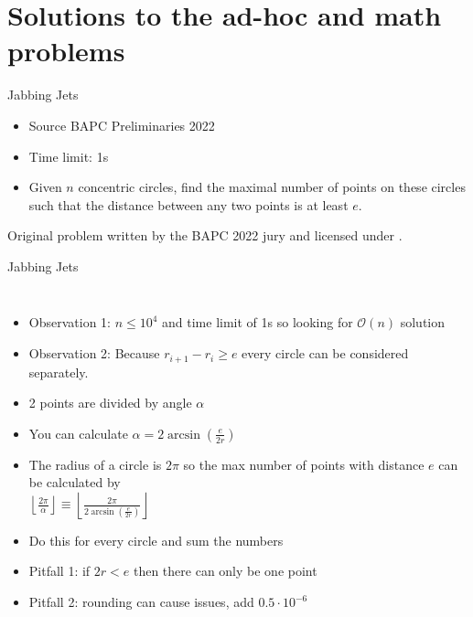 \documentclass[11pt,pdf, aspectratio=169]{beamer}
\begin{document}
  \section{Solutions to the ad-hoc and math problems}
  \begin{frame}{Jabbing Jets}
    \begin{itemize}
      \item Source BAPC Preliminaries 2022
      \item Time limit: 1s
      \item Given $n$ concentric circles, find the maximal number of points on these circles such that the distance between any two points is at least $e$.
    \end{itemize}
    Original problem written by the BAPC 2022 jury and licensed under \doclicenseLongNameRef.

    \doclicenseImage

  \end{frame}
  \begin{frame}{Jabbing Jets}
    \begin{columns}
      \begin{itemize}
        \item<1-> Observation 1: $n \leq 10^4$ and time limit of 1s so looking for $\mathcal{O}(n)$ solution
        \item<2-> Observation 2: Because $r_{i+1}-r_i \geq e$ every circle can be considered separately.
        \item<3-> 2 points are divided by angle $\alpha$
        \item<3-> You can calculate $\alpha = 2 \arcsin{}(\frac{e}{2r})$
        \item<4-> The radius of a circle is $2\pi$ so the max number of points with distance $e$ can be calculated by\\
        $\left\lfloor\frac{2\pi}{\alpha}\right\rfloor \equiv \left\lfloor \frac{2\pi}{2 \arcsin{}(\frac{e}{2r})}\right\rfloor$
        \item<5-> Do this for every circle and sum the numbers
        \item<5-> Pitfall 1: if $2r < e$ then there can only be one point
        \item<5-> Pitfall 2: rounding can cause issues, add $0.5\cdot 10^{-6}$
      \end{itemize}
      
    \end{columns}
  \end{frame}
\end{document}
